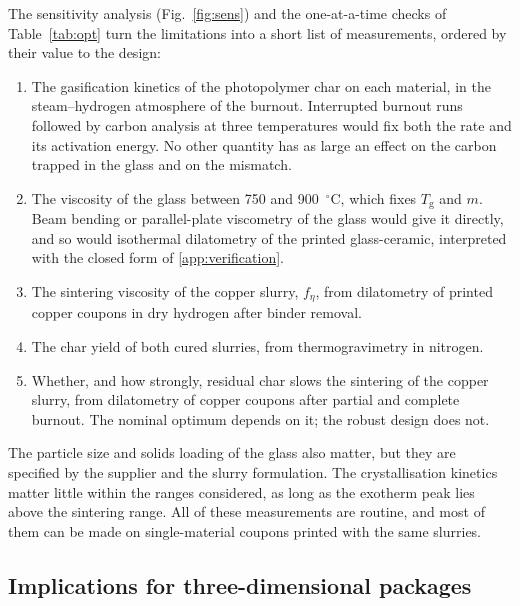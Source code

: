 The sensitivity analysis (Fig.~\ref{fig:sens}) and the one-at-a-time checks of Table~\ref{tab:opt} turn the limitations into a short list of measurements, ordered by their value to the design:
\begin{enumerate}
\item The gasification kinetics of the photopolymer char on each material, in the steam--hydrogen atmosphere of the burnout. Interrupted burnout runs followed by carbon analysis at three temperatures would fix both the rate and its activation energy. No other quantity has as large an effect on the carbon trapped in the glass and on the mismatch.
\item The viscosity of the glass between 750 and 900~$^\circ$C, which fixes $T_{\mathrm{g}}$ and $m$. Beam bending or parallel-plate viscometry of the glass would give it directly, and so would isothermal dilatometry of the printed glass-ceramic, interpreted with the closed form of \ref{app:verification}.
\item The sintering viscosity of the copper slurry, $f_\eta$, from dilatometry of printed copper coupons in dry hydrogen after binder removal.
\item The char yield of both cured slurries, from thermogravimetry in nitrogen.
\item Whether, and how strongly, residual char slows the sintering of the copper slurry, from dilatometry of copper coupons after partial and complete burnout. The nominal optimum depends on it; the robust design does not.
\end{enumerate}
The particle size and solids loading of the glass also matter, but they are specified by the supplier and the slurry formulation. The crystallisation kinetics matter little within the ranges considered, as long as the exotherm peak lies above the sintering range. All of these measurements are routine, and most of them can be made on single-material coupons printed with the same slurries.

\subsection{Implications for three-dimensional packages}

